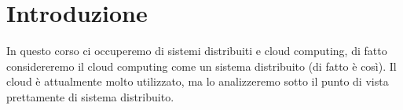 \chapter{Introduzione}
In questo corso ci occuperemo di sistemi distribuiti e cloud computing, di fatto considereremo il cloud computing come un sistema distribuito (di fatto è così).
Il cloud è attualmente molto utilizzato, ma lo analizzeremo sotto il punto di vista prettamente di sistema distribuito.
